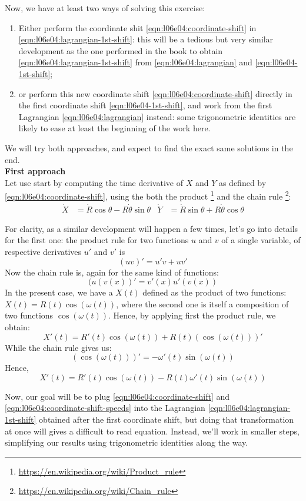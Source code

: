 \documentclass[solutions.tex]{subfiles}
\begin{document}
Now, we have at least two ways of solving this exercise:
\begin{enumerate}
	\item Either perform the coordinate shit \eqref{eqn:l06e04:coordinate-shift}
	in \eqref{eqn:l06e04:lagrangian-1st-shift}: this will be a tedious
	but very similar development as the one performed in the book to obtain
	\eqref{eqn:l06e04:lagrangian-1st-shift} from \eqref{eqn:l06e04:lagrangian}
	and \eqref{eqn:l06e04-1st-shift};
	\item or perform this new coordinate shift \eqref{eqn:l06e04:coordinate-shift}
	directly in the first coordinate shift \eqref{eqn:l06e04-1st-shift}, and
	work from the first Lagrangian \eqref{eqn:l06e04:lagrangian} instead: some
	trigonometric identities are likely to ease at least the beginning of the
	work here.
\end{enumerate}
We will try both approaches, and expect to find the exact same solutions in
the end. \\
\hr
\textbf{First approach}\\
Let use start by computing the time derivative of $X$ and $Y$ as defined
by \eqref{eqn:l06e04:coordinate-shift}, using the both the product
\footnote{\url{https://en.wikipedia.org/wiki/Product\_rule}}
and the chain rule
\footnote{\url{https://en.wikipedia.org/wiki/Chain\_rule}}:
\begin{align}
	\dot{X} &= \dot{R}\cos\theta - R\dot\theta\sin\theta
	& \dot{Y} &= \dot{R}\sin\theta + R\dot\theta\cos\theta
	\label{eqn:l06e04:coordinate-shift-speeds}
\end{align}

\begin{remark} For clarity, as a similar development will happen
a few times, let's go into details for the first one:
the product rule for two functions $u$ and $v$ of a single variable, of
respective derivatives $u'$ and $v'$ is
\[ (u v)' = u'v+uv' \]
Now the chain rule is, again for the same kind of functions:
\[ (u(v(x))' = v'(x)u'(v(x)) \]
In the present case, we have a $X(t)$ defined as the product of two
functions: $X(t) = R(t)\cos(\omega(t))$, where the second one is
itself a composition of two functions $\cos(\omega(t))$. Hence,
by applying first the product rule, we obtain:
\[
	X'(t) = R'(t)\cos(\omega(t)) + R(t)\left(\cos(\omega(t))\right)'
\]
While the chain rule gives us:
\[
	(\cos(\omega(t)))' = -\omega'(t)\sin(\omega(t))
\]
Hence,
\[
	X'(t) = R'(t)\cos(\omega(t)) - R(t)\omega'(t)\sin(\omega(t))
\]
\end{remark}
Now, our goal will be to plug \eqref{eqn:l06e04:coordinate-shift} and
\eqref{eqn:l06e04:coordinate-shift-speeds} into the Lagrangian
\eqref{eqn:l06e04:lagrangian-1st-shift} obtained after the first
coordinate shift, but doing that transformation at once will gives
a difficult to read equation. Instead, we'll work in smaller steps,
simplifying our results using trigonometric identities along the way. \\
\end{document}
